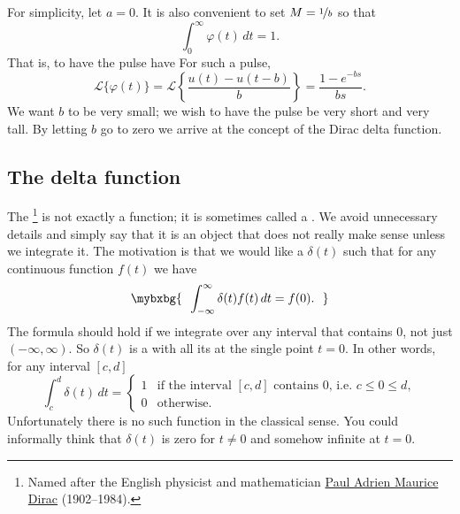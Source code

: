 For simplicity, let $a=0$.
It is also convenient
to set $M = \nicefrac{1}{b}$ so that
\begin{equation*}
\int_0^\infty \varphi(t) \,dt = 1 .
\end{equation*}
That is, to have the pulse have 
For such a pulse,
\begin{equation*}
{\mathcal{L}} \bigl\{ \varphi(t) \bigr\}
=
{\mathcal{L}} \left\{ \frac{u(t) - u(t-b)}{b}  \right\}
=
\frac{1 - e^{-bs}}{bs} .
\end{equation*}
We want $b$ to be very small; we wish to have
the pulse be very short and very tall.  By letting $b$ go to zero we arrive
at the concept of the Dirac delta function.

\subsection{The delta function}

The \emph{}%
\footnote{Named after the English physicist and mathematician
\href{https://en.wikipedia.org/wiki/Paul_Dirac}{Paul Adrien Maurice Dirac}
(1902--1984).}
is not exactly a function; it is sometimes called a
\emph{}.  We
avoid unnecessary details and simply say that it is an object
that does not really make sense unless we integrate it.  The motivation is
that we would like a  $\delta(t)$
such that 
for any continuous function $f(t)$ we have
\begin{equation*}
\mybxbg{~~
\int_{-\infty}^\infty \delta(t) f(t) \,dt = f(0) .
~~}
\end{equation*}
The formula should hold if we integrate over any interval that contains 0,
not just $(-\infty,\infty)$.
So $\delta(t)$ is a  
with all its  at the single point $t=0$.  In other words, for any
interval $[c,d]$
\begin{equation*}
\int_c^d \delta(t) \,dt = 
\begin{cases}
1 & \text{if the interval $[c,d]$ contains 0, i.e.\ } c \leq 0 \leq d, \\
0 & \text{otherwise.}
\end{cases}
\end{equation*}
Unfortunately there is no such function in the classical sense.  You could
informally think that $\delta(t)$ is zero for $t\not=0$ and somehow
infinite at $t=0$.

